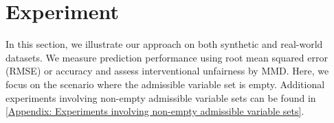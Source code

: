 \documentclass{article} %
\begin{document}
\section{Experiment} \label{sec: Experiment}

In this section, we illustrate our approach on both synthetic and real-world datasets. We measure prediction performance using root mean squared error (RMSE) or accuracy and assess interventional unfairness by MMD. 
Here, we focus on the scenario where the admissible variable set is empty. Additional experiments involving non-empty admissible variable sets can be found in \cref{Appendix: Experiments involving non-empty admissible variable sets}.
\end{document}
